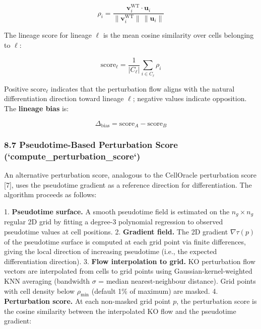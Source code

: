 \documentclass[11pt]{article}
\begin{document}
\begin{equation}
\rho_i = \frac{\mathbf{v}_i^{\mathrm{WT}} \cdot \mathbf{u}_i}{\|\mathbf{v}_i^{\mathrm{WT}}\|\,\|\mathbf{u}_i\|} 
\end{equation}

The lineage score for lineage $\ell$ is the mean cosine similarity over cells belonging to $\ell$:

\begin{equation}
\text{score}_\ell = \frac{1}{|C_\ell|}\sum_{i \in C_\ell} \rho_i
\end{equation}

Positive $\text{score}_\ell$ indicates that the perturbation flow aligns with the natural differentiation direction toward lineage $\ell$; negative values indicate opposition. The \textbf{lineage bias} is:

\begin{equation}
\Delta_{\mathrm{bias}} = \text{score}_A - \text{score}_B
\end{equation}



\subsubsection*{8.7 Pseudotime-Based Perturbation Score (`compute\_perturbation\_score`)}

An alternative perturbation score, analogous to the CellOracle perturbation score [7], uses the pseudotime gradient as a reference direction for differentiation. The algorithm proceeds as follows:

1. \textbf{Pseudotime surface.} A smooth pseudotime field is estimated on the $n_g \times n_g$ regular 2D grid by fitting a degree-3 polynomial regression to observed pseudotime values at cell positions.
2. \textbf{Gradient field.} The 2D gradient $\nabla \tau(p)$ of the pseudotime surface is computed at each grid point via finite differences, giving the local direction of increasing pseudotime (i.e., the expected differentiation direction).
3. \textbf{Flow interpolation to grid.} KO perturbation flow vectors are interpolated from cells to grid points using Gaussian-kernel-weighted KNN averaging (bandwidth $\sigma$ = median nearest-neighbour distance). Grid points with cell density below $\rho_{\min}$ (default 1\% of maximum) are masked.
4. \textbf{Perturbation score.} At each non-masked grid point $p$, the perturbation score is the cosine similarity between the interpolated KO flow and the pseudotime gradient:
\end{document}
